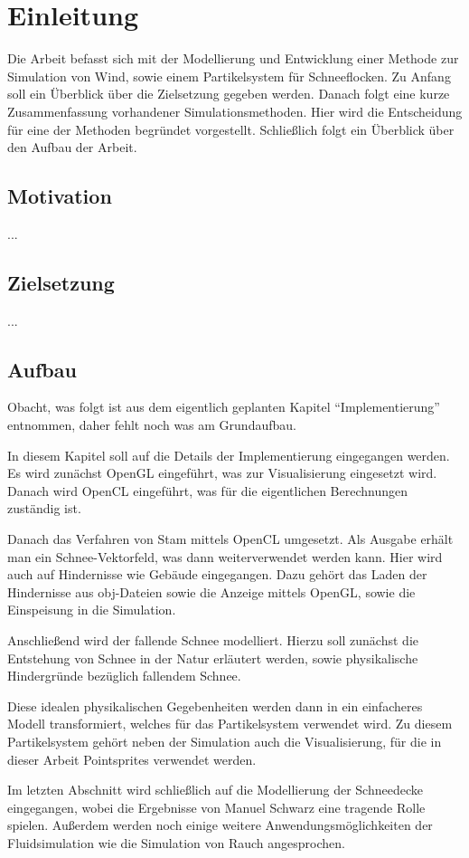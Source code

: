 \section{Einleitung}

Die Arbeit befasst sich mit der Modellierung und Entwicklung einer Methode zur
Simulation von Wind, sowie einem Partikelsystem für Schneeflocken. Zu Anfang
soll ein Überblick über die Zielsetzung gegeben werden. Danach folgt eine kurze
Zusammenfassung vorhandener Simulationsmethoden. Hier wird die Entscheidung für
eine der Methoden begründet vorgestellt. Schließlich folgt ein Überblick über
den Aufbau der Arbeit.

\subsection{Motivation}

...

\subsection{Zielsetzung}

...

\subsection{Aufbau}

Obacht, was folgt ist aus dem eigentlich geplanten Kapitel
``Implementierung'' entnommen, daher fehlt noch was am Grundaufbau.

In diesem Kapitel soll auf die Details der Implementierung eingegangen werden. Es
wird zunächst OpenGL eingeführt, was zur Visualisierung eingesetzt wird. Danach
wird OpenCL eingeführt, was für die eigentlichen Berechnungen zuständig ist.

Danach das Verfahren von Stam mittels OpenCL umgesetzt. Als Ausgabe erhält man
ein Schnee-Vektorfeld, was dann weiterverwendet werden kann. Hier wird auch auf
Hindernisse wie Gebäude eingegangen. Dazu gehört das Laden der Hindernisse aus
obj-Dateien sowie die Anzeige mittels OpenGL, sowie die Einspeisung in die
Simulation.

Anschließend wird der fallende Schnee modelliert. Hierzu soll zunächst die
Entstehung von Schnee in der Natur erläutert werden, sowie physikalische
Hindergründe bezüglich fallendem Schnee.

Diese idealen physikalischen Gegebenheiten werden dann in ein einfacheres
Modell transformiert, welches für das Partikelsystem verwendet wird. Zu diesem
Partikelsystem gehört neben der Simulation auch die Visualisierung, für die in
dieser Arbeit Pointsprites verwendet werden.

Im letzten Abschnitt wird schließlich auf die Modellierung der Schneedecke
eingegangen, wobei die Ergebnisse von Manuel Schwarz \cite{Schwarz2012} eine
tragende Rolle spielen. Außerdem werden noch einige weitere
Anwendungsmöglichkeiten der Fluidsimulation wie die Simulation von Rauch
angesprochen.
